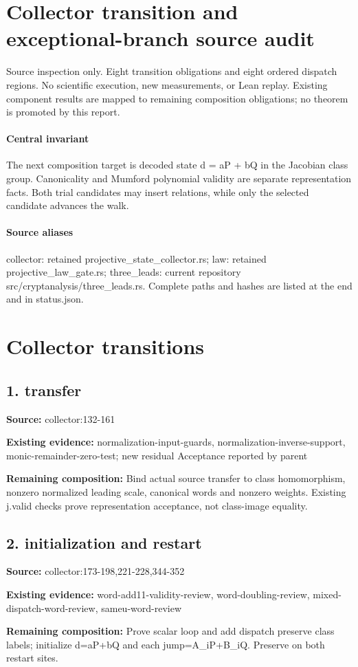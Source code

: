 \documentclass[10pt]{article}
\begin{document}
\sloppy
\section*{Collector transition and exceptional-branch source audit}
Source inspection only. Eight transition obligations and eight ordered dispatch regions. No scientific execution, new measurements, or Lean replay. Existing component results are mapped to remaining composition obligations; no theorem is promoted by this report.
\paragraph{Central invariant}
The next composition target is decoded state d = aP + bQ in the Jacobian class group. Canonicality and Mumford polynomial validity are separate representation facts. Both trial candidates may insert relations, while only the selected candidate advances the walk.
\paragraph{Source aliases}
collector: retained projective\_state\_collector.rs; law: retained projective\_law\_gate.rs; three\_leads: current repository src/cryptanalysis/three\_leads.rs. Complete paths and hashes are listed at the end and in status.json.
\section*{Collector transitions}
\subsection*{1. transfer}
\textbf{Source:} collector:132-161\par
\textbf{Existing evidence:} normalization-input-guards, normalization-inverse-support, monic-remainder-zero-test; new residual Acceptance reported by parent\par
\textbf{Remaining composition:} Bind actual source transfer to class homomorphism, nonzero normalized leading scale, canonical words and nonzero weights. Existing j.valid checks prove representation acceptance, not class-image equality.\par
\subsection*{2. initialization and restart}
\textbf{Source:} collector:173-198,221-228,344-352\par
\textbf{Existing evidence:} word-add11-validity-review, word-doubling-review, mixed-dispatch-word-review, sameu-word-review\par
\textbf{Remaining composition:} Prove scalar loop and add dispatch preserve class labels; initialize d=aP+bQ and each jump=A\_iP+B\_iQ. Preserve on both restart sites.\par
\end{document}
